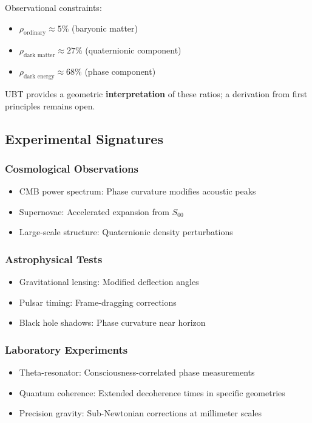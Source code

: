 Observational constraints:
\begin{itemize}
    \item $\rho_{\text{ordinary}} \approx 5\%$ (baryonic matter)
    \item $\rho_{\text{dark matter}} \approx 27\%$ (quaternionic component)
    \item $\rho_{\text{dark energy}} \approx 68\%$ (phase component)
\end{itemize}

UBT provides a geometric \textbf{interpretation} of these ratios;
a derivation from first principles remains open.

\subsection{Experimental Signatures}

\subsubsection{Cosmological Observations}

\begin{itemize}
    \item CMB power spectrum: Phase curvature modifies acoustic peaks
    \item Supernovae: Accelerated expansion from $S_{00}$
    \item Large-scale structure: Quaternionic density perturbations
\end{itemize}

\subsubsection{Astrophysical Tests}

\begin{itemize}
    \item Gravitational lensing: Modified deflection angles
    \item Pulsar timing: Frame-dragging corrections
    \item Black hole shadows: Phase curvature near horizon
\end{itemize}

\subsubsection{Laboratory Experiments}

\begin{itemize}
    \item Theta-resonator: Consciousness-correlated phase measurements
    \item Quantum coherence: Extended decoherence times in specific geometries
    \item Precision gravity: Sub-Newtonian corrections at millimeter scales
\end{itemize}


